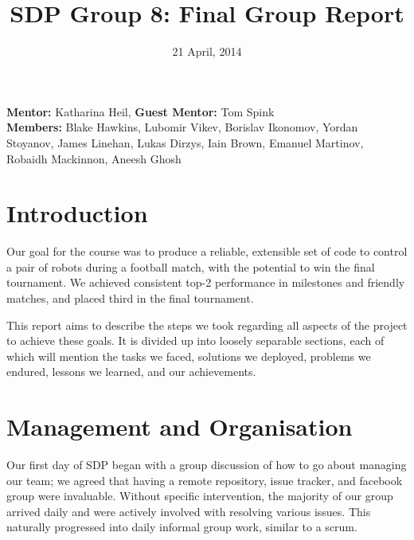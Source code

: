 \documentclass[a4paper,11pt]{article}
\title{SDP Group 8: Final Group Report} %
\date{21 April, 2014} %
\begin{document}
\maketitle %

\begin{center}
\textbf{Mentor:} Katharina Heil, \textbf{Guest Mentor:} Tom Spink %
\\
\textbf{Members:} Blake Hawkins, %
Lubomir Vikev,
Borislav Ikonomov,
Yordan Stoyanov,
James Linehan,
Lukas Dirzys,
Iain Brown,
Emanuel Martinov,
Robaidh Mackinnon,
Aneesh Ghosh

\end{center}


\section{Introduction}

Our goal for the course was to produce a reliable, extensible set of code to control a pair of robots during a football match, with the potential to win the final tournament. We achieved consistent top-2 performance in milestones and friendly matches, and placed third in the final tournament. 

This report aims to describe the steps we took regarding all aspects of the project to achieve these goals. It is divided up into loosely separable sections, each of which will mention the tasks we faced, solutions we deployed, problems we endured, lessons we learned, and our achievements. 


\section{Management and Organisation}

Our first day of SDP began with a group discussion of how to go about managing our team; we agreed that having a remote repository, issue tracker, and facebook group were invaluable. Without specific intervention, the majority of our group arrived daily and were actively involved with resolving various issues. This naturally progressed into daily informal group work, similar to a scrum.
\end{document}
